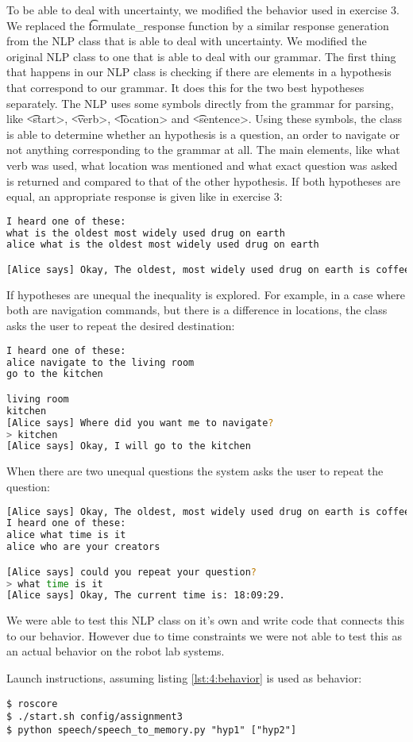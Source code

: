 To be able to deal with uncertainty, we modified the behavior used in exercise 3. We replaced the \t{formulate_response} function by a similar response generation from the NLP class that is able to deal with uncertainty. We modified the original NLP class to one that is able to deal with our grammar.
The first thing that happens in our NLP class is checking if there are elements in a hypothesis that correspond to our grammar. It does this for the two best hypotheses separately. The NLP uses some symbols directly from the grammar for parsing, like \t{<start>}, \t{<verb>}, \t{<location>} and \t{<sentence>}. Using these symbols, the class is able to determine whether an hypothesis is a question, an order to navigate or not anything corresponding to the grammar at all. The main elements, like what verb was used, what location was mentioned and what exact question was asked is returned and compared to that of the other hypothesis.
If both hypotheses are equal, an appropriate response is given like in exercise 3:

\begin{lstlisting}[language=bash]
I heard one of these:
what is the oldest most widely used drug on earth
alice what is the oldest most widely used drug on earth

[Alice says] Okay, The oldest, most widely used drug on earth is coffee.
\end{lstlisting}

If hypotheses are unequal the inequality is explored. For example, in a case where both are navigation commands, but there is a difference in locations, the class asks the user to repeat the desired destination:

\begin{lstlisting}[language=bash]
I heard one of these:
alice navigate to the living room
go to the kitchen

living room
kitchen
[Alice says] Where did you want me to navigate?
> kitchen
[Alice says] Okay, I will go to the kitchen
\end{lstlisting}

When there are two unequal questions the system asks the user to repeat the question:

\begin{lstlisting}[language=bash]
[Alice says] Okay, The oldest, most widely used drug on earth is coffee.
I heard one of these:
alice what time is it
alice who are your creators

[Alice says] could you repeat your question?
> what time is it
[Alice says] Okay, The current time is: 18:09:29.
\end{lstlisting}

We were able to test this NLP class on it's own and write code that connects this to our behavior. However due to time constraints we were not able to test this as an actual behavior on the robot lab systems.

Launch instructions, assuming listing \ref{lst:4:behavior} is used as behavior:
\begin{lstlisting}
$ roscore
$ ./start.sh config/assignment3
$ python speech/speech_to_memory.py "hyp1" ["hyp2"]
\end{lstlisting}